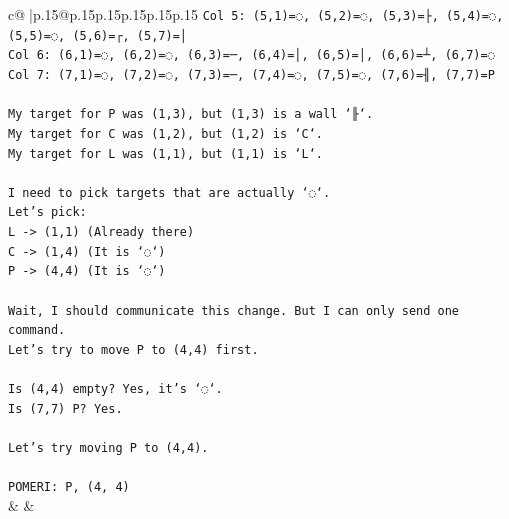 \documentclass{article}
\begin{document}
{\begin{supertabular}{c@{$\;$}|p{.15\linewidth}@{}p{.15\linewidth}p{.15\linewidth}p{.15\linewidth}p{.15\linewidth}p{.15\linewidth}}
{{{\texttt{Col 5: (5,1)=◌, (5,2)=◌, (5,3)=├, (5,4)=◌, (5,5)=◌, (5,6)=┌, (5,7)=│} \\
\texttt{Col 6: (6,1)=◌, (6,2)=◌, (6,3)=─, (6,4)=│, (6,5)=│, (6,6)=┴, (6,7)=◌} \\
\texttt{Col 7: (7,1)=◌, (7,2)=◌, (7,3)=─, (7,4)=◌, (7,5)=◌, (7,6)=╢, (7,7)=P} \\
\\ 
\texttt{My target for P was (1,3), but (1,3) is a wall `╟`.} \\
\texttt{My target for C was (1,2), but (1,2) is `C`.} \\
\texttt{My target for L was (1,1), but (1,1) is `L`.} \\
\\ 
\texttt{I need to pick targets that are actually `◌`.} \\
\texttt{Let's pick:} \\
\texttt{L {-}> (1,1) (Already there)} \\
\texttt{C {-}> (1,4) (It is `◌`)} \\
\texttt{P {-}> (4,4) (It is `◌`)} \\
\\ 
\texttt{Wait, I should communicate this change. But I can only send one command.} \\
\texttt{Let's try to move P to (4,4) first.} \\
\\ 
\texttt{Is (4,4) empty? Yes, it's `◌`.} \\
\texttt{Is (7,7) P? Yes.} \\
\\ 
\texttt{Let's try moving P to (4,4).} \\
\\ 
\texttt{POMERI: P, (4, 4)} \\
            }
        }
    }
    & & \\ \\


\end{supertabular}}
\end{document}
